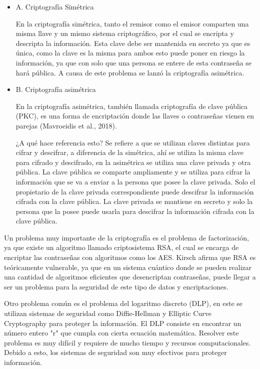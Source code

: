 \documentclass[twoside]{article}
\begin{document}
\begin{itemize}
    \item{A}. Criptografía Simétrica

        En la criptografía simétrica, tanto el remisor como el emisor comparten una misma llave y un mismo sistema criptográfico, por el cual se encripta y descripta la información. Esta clave debe ser mantenida en secreto ya que es única, como la clave es la misma para ambos esto puede poner en riesgo la información, ya que con solo que una persona se entere de esta contraseña se hará pública. A causa de este problema se lanzó la criptografía asimétrica. 
    \item{B}. Criptografía asimétrica

        En la criptografía asimétrica, también llamada criptografía de clave pública (PKC), es una forma de encriptación donde las llaves o contraseñas vienen en parejas (Mavroeidis et al., 2018). 

        ¿A qué hace referencia esto? Se refiere a que se utilizan claves distintas para cifrar y descifrar, a diferencia de la simétrica, ahí se utiliza la misma clave para cifrado y descifrado, en la asimétrica se utiliza una clave privada y otra pública. La clave pública se comparte ampliamente y se utiliza para cifrar la información que se va a enviar a la persona que posee la clave privada. Solo el propietario de la clave privada correspondiente puede descifrar la información cifrada con la clave pública. La clave privada se mantiene en secreto y solo la persona que la posee puede usarla para descifrar la información cifrada con la clave pública. 
\end{itemize}

Un problema muy importante de la criptografía es el problema de factorización, ya que existe un algoritmo llamado criptosistema RSA, el cual se encarga de encriptar las contraseñas con algoritmos como los AES. Kirsch afirma que RSA es teóricamente vulnerable, ya que en un sistema cuántico donde se pueden realizar una cantidad de algoritmos eficientes que desencriptan contraseñas, puede llegar a ser un problema para la seguridad de este tipo de datos y encriptaciones. 

Otro problema común es el problema del logaritmo discreto (DLP), en este se utilizan sistemas de seguridad como Diffie-Hellman y Elliptic Curve Cryptography para proteger la información. El DLP consiste en encontrar un número entero "r" que cumpla con cierta ecuación matemática. Resolver este problema es muy difícil y requiere de mucho tiempo y recursos computacionales. Debido a esto, los sistemas de seguridad son muy efectivos para proteger información. 
\end{document}
